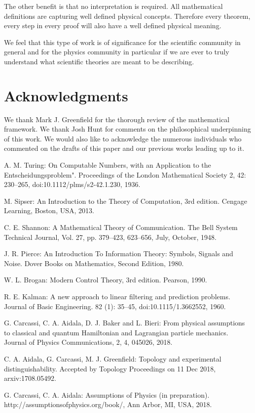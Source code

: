 \documentclass[letterpaper]{article}
\theoremstyle{plain}%
\theoremstyle{definition}
\theoremstyle{remark}
\numberwithin{equation}{section}
\begin{document}
The other benefit is that no interpretation is required. All mathematical definitions are capturing well defined physical concepts. Therefore every theorem, every step in every proof will also have a well defined physical meaning.

We feel that this type of work is of significance for the scientific community in general and for the physics community in particular if we are ever to truly understand what scientific theories are meant to be describing.

\section{Acknowledgments}

We thank Mark J. Greenfield for the thorough review of the mathematical framework. We thank Josh Hunt for comments on the philosophical underpinning of this work. We would also like to acknowledge the numerous individuals who commented on the drafts of this paper and our previous works leading up to it.



\begin{thebibliography}{1}
	
	A. M. Turing: On Computable Numbers, with an Application to the Entscheidungsproblem". Proceedings of the London Mathematical Society 2, 42: 230–265, doi:10.1112/plms/s2-42.1.230, 1936. 
	
	 M. Sipser: An Introduction to the Theory of Computation, 3rd edition. Cengage Learning, Boston, USA, 2013.
	
	 C. E. Shannon: A Mathematical Theory of Communication. The Bell System Technical Journal,
	Vol. 27, pp. 379–423, 623–656, July, October, 1948.
	
	 J. R. Pierce: An Introduction To Information Theory: Symbols, Signals and Noise. Dover Books on Mathematics, Second Edition, 1980.
	
	 W. L. Brogan: Modern Control Theory, 3rd edition. Pearson, 1990. 	
	
	 R. E. Kalman: A new approach to linear filtering and prediction problems. Journal of Basic Engineering. 82 (1): 35–45, doi:10.1115/1.3662552, 1960.
	
	 G. Carcassi, C. A. Aidala, D. J. Baker and L. Bieri: From physical assumptions to classical and quantum Hamiltonian and Lagrangian particle mechanics. Journal of Physics Communications, 2, 4, 045026, 2018.
	
	 C. A. Aidala, G. Carcassi, M. J. Greenfield: Topology and experimental distinguishability. Accepted by Topology Proceedings on 11 Dec 2018, arxiv:1708.05492.
	
	 G. Carcassi, C. A. Aidala: Assumptions of Physics (in preparation). http://assumptionsofphysics.org/book/, Ann Arbor, MI, USA, 2018.
\end{thebibliography}
\end{document}
